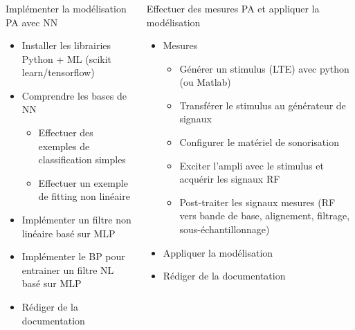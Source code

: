 \documentclass[aspectratio=169]{beamer}
\begin{document}
\begin{frame}
  \frametitle{\insertsection}
\footnotesize
  \begin{columns}[t]
    \begin{column}{0.6\textwidth}
      Implémenter la modélisation PA avec NN
      \begin{itemize}
        \item Installer les librairies Python + ML (scikit learn/tensorflow)
        \item Comprendre les bases de NN
        \begin{itemize}
          \footnotesize
          \item Effectuer des exemples de classification simples
          \item Effectuer un exemple de fitting non linéaire
        \end{itemize}
        \item Implémenter un filtre non linéaire basé sur MLP
        \item Implémenter le BP pour entrainer un filtre NL basé sur MLP
        \item Rédiger de la documentation
      \end{itemize}
    \end{column}
    \begin{column}{0.6\textwidth}
      Effectuer des mesures PA et appliquer la modélisation
      \begin{itemize}
        \item Mesures
        \begin{itemize}
          \footnotesize
          \item Générer un stimulus (LTE) avec python (ou Matlab)
          \item Transférer le stimulus au générateur de signaux
          \item Configurer le matériel de sonorisation
          \item Exciter l'ampli avec le stimulus et acquérir les signaux RF
          \item Post-traiter les signaux mesures (RF vers bande de base, alignement, filtrage, sous-échantillonnage)
        \end{itemize}
        \item Appliquer la modélisation
        \item Rédiger de la documentation
      \end{itemize}

    \end{column}
  \end{columns}

\end{frame}
\end{document}
